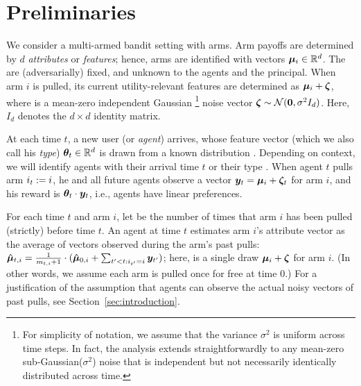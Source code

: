 \section{Preliminaries}
\label{sec:prob}

We consider a multi-armed bandit setting with \ARMNUM arms.
Arm payoffs are determined by $d$ \emph{attributes} or \emph{features};
hence, arms are identified with vectors $\ArmV{i} \in \R^d$.
The  are (adversarially) fixed, and unknown to the agents
and the principal.
When arm $i$ is pulled, its current utility-relevant features are
determined as $\ArmV{i} + \NoiseV$, where \NoiseV is a mean-zero independent Gaussian%
\footnote{For simplicity of notation, we assume that the variance
  $\sigma^2$ is uniform across time steps.
In fact, the analysis extends straightforwardly to any
mean-zero sub-Gaussian($\sigma^2$) noise that is independent but not necessarily identically distributed across time.}
noise vector $\NoiseV \sim \Normal{\vc{0}}{\sigma^2 I_{d}}$.
Here, $I_d$ denotes the $d \times d$ identity matrix.

At each time $t$, a new user (or \emph{agent}) arrives,
whose feature vector (which we also call his \emph{type})
$\AgentV{t} \in \R^d$ is drawn from a known distribution \AgentDist.
Depending on context, we will identify agents with their arrival time
$t$ or their type .
When agent $t$ pulls arm $\Pull{t} := i$,
he and all future agents observe a vector
$\ObsV{t} = \ArmV{i} + \NoiseV[t]$ for arm $i$,
and his reward is $\AgentV{t} \cdot \ObsV{t}$,
i.e., agents have linear preferences.

For each time $t$ and arm $i$, let  be the number of
times that arm $i$ has been pulled (strictly) before time $t$.
An agent at time $t$ estimates arm $i$'s attribute vector as the
average of vectors observed during the arm's past pulls:
$\ArmEV{t}{i} = \frac{1}{\NumPull{t}{i}+1} \cdot
(\ArmEV{0}{i} + \sum_{t'<t: \Pull{t'} = i} \ObsV{t'})$;
here,  is a single draw $\ArmV{i} + \NoiseV$ for arm $i$.
(In other words, we assume each arm is pulled once for free at time 0.)
For a justification of the assumption that agents can observe
the actual noisy vectors  of past pulls, see
Section~\ref{sec:introduction}.
  
